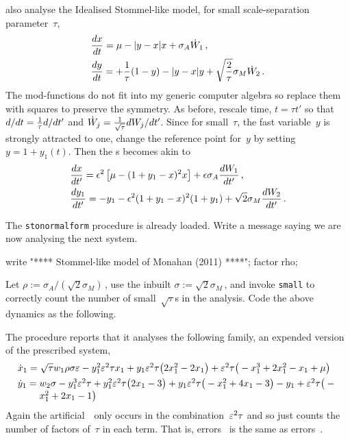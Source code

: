 \cite{Monahan2011} also analyse the Idealised Stommel-like model, for small scale-separation parameter~\(\tau\),
\begin{align*}
&\de tx=\mu-|y-x|x+\sigma_A\dot W_1\,,
\\&\de ty=+\frac1\tau(1-y)-|y-x|y+\sqrt{\frac2\tau}\sigma_M\dot W_2\,.
\end{align*}
The mod-functions do not fit into my generic computer algebra so replace them with squares to preserve the symmetry.
As before, rescale time, $t=\tau t'$  so that $\de t{}=\frac1\tau\de{t'}{}$ and $\dot W_j=\frac1{\sqrt{\tau}}\de {t'}{W_j}$.
Since for small~$\tau$, the fast variable~$y$ is strongly attracted to one, change the reference point for~$y$ by setting $y=1+y_1(t)$.
Then the \sde{}s becomes akin to
\begin{align*}
&\de {t'}x=\epsilon^2\left[\mu-(1+y_1-x)^2x\right]+\epsilon\sigma_A\de{t'}{W_1}\,,
\\&\de {t'}{y_1}=-y_1-\epsilon^2(1+y_1-x)^2(1+y_1)+\sqrt{2}\sigma_M\de{t'}{W_2}\,.
\end{align*}

The \verb|stonormalform| procedure is already loaded.
Write a message saying we are now analysing the next system.
\begin{reduce}
write "**** Stommel-like model of Monahan (2011) ****";
factor rho;
\end{reduce}

Let $\rho:=\sigma_A/(\sqrt2\sigma_M)$\,, use the inbuilt $\sigma:=\sqrt2\sigma_M$\,, and invoke \verb|small| to correctly count the number of small~$\sqrt\tau$s in the analysis.
Code the above dynamics as the following.


The procedure reports that it analyses the following family, an expended version of the prescribed system,
\begin{align*}&
\dot x_{1}=\ParMath{ \sqrt {\tau } w_{1} \rho  \sigma  \eps-y_{1}^{2} \eps^{2} 
\tau  x_{1}+y_{1} \eps^{2} \tau  \big(2 x_{1}^{2}-2 x_{1}\big)+\eps^{2} 
\tau  \big(-x_{1}^{3}+2 x_{1}^{2}-x_{1}+\mu \big)
}
\\&
\dot y_{1}=\ParMath{ w_{2} \sigma -y_{1}^{3} \eps^{2} \tau +y_{1}^{2} \eps^{2} 
\tau  \big(2 x_{1}-3\big)+y_{1} \eps^{2} \tau  \big(-x_{1}^{2}+4 x_{1}-3
\big)-y_{1}+\eps^{2} \tau  \big(-x_{1}^{2}+2 x_{1}-1\big)
}
\end{align*}
Again the artificial~\eps\ only occurs in the combination~\(\varepsilon^2\tau\) and so just counts the number of factors of~\(\tau\) in each term.  That is, errors~ is the same as errors~.

